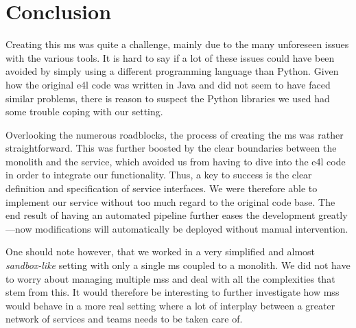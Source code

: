 \section{Conclusion}

Creating this \gls{ms} was quite a challenge, mainly due to the many
unforeseen issues with the various tools. It is hard to say if a lot
of these issues could have been avoided by simply using a different
programming language than Python. Given how the original \gls{e4l}
code was written in Java and did not seem to have faced similar
problems, there is reason to suspect the Python libraries we used had
some trouble coping with our setting.

Overlooking the numerous roadblocks, the process of creating the
\gls{ms} was rather straightforward. This was further boosted by the
clear boundaries between the monolith and the service, which avoided
us from having to dive into the \gls{e4l} code in order to integrate
our functionality. Thus, a key to success is the clear definition and
specification of service interfaces. We were therefore able to implement our service
without too much regard to the original code base. The end result of
having an automated pipeline further eases the development greatly---now
modifications will automatically be deployed without manual
intervention.

One should note however, that we worked in a very simplified and
almost \emph{sandbox-like} setting with only a single \gls{ms} coupled to
a monolith. We did not have to worry about managing multiple
\glspl{ms} and deal with all the complexities that stem from this. It
would therefore be interesting to further investigate how \glspl{ms} would
behave in a more real setting where a lot of interplay between a
greater network of services and teams needs to be taken care of.

